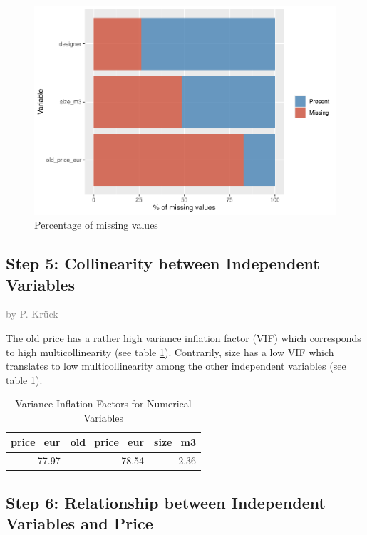 \documentclass[a4paper, nobind]{templates/ociamthesis}
\begin{document}
\begin{figure}
\includegraphics[width=1\linewidth]{_main_files/figure-latex/missing-values-1} \caption{Percentage of missing values}\label{fig:missing-values}
\end{figure}

\hypertarget{collinearity}{%
\subsection{Step 5: Collinearity between Independent Variables}\label{collinearity}}

\textcolor{gray}{by P. Krück}

The old price has a rather high variance inflation factor (VIF) which corresponds to high multicollinearity (see table \ref{tab:vif}). Contrarily, size has a low VIF which translates to low multicollinearity among the other independent variables (see table \ref{tab:vif}).

\begin{table}

\caption{\label{tab:vif}Variance Inflation Factors for Numerical Variables}
\centering
\begin{tabular}[t]{r|r|r}
\hline
price\_eur & old\_price\_eur & size\_m3\\
\hline
77.97 & 78.54 & 2.36\\
\hline
\end{tabular}
\end{table}

\hypertarget{relationship}{%
\subsection{Step 6: Relationship between Independent Variables and Price}\label{relationship}}
\end{document}
